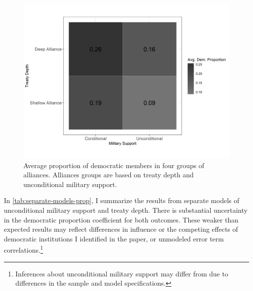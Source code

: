 \documentclass[12pt]{article}
\begin{document}
\begin{figure}
\includegraphics[width=.95\textwidth]{democ-prop-combo.png}  
\caption{Average proportion of democratic members in four groups of alliances. Alliances groups are based on treaty depth and unconditional military support.}
\label{fig:democ-prop-combo}
\end{figure}


In \autoref{tab:separate-models-prop}, I summarize the results from separate models of unconditional military support and treaty depth.
There is substantial uncertainty in the democratic proportion coefficient for both outcomes. 
These weaker than expected results may reflect differences in influence or the competing effects of democratic institutions I identified in the paper, or unmodeled error term correlations.\footnote{Inferences about unconditional military support may differ from \citet{Chibaetal2015} due to differences in the sample and model specifications.}
\end{document}
